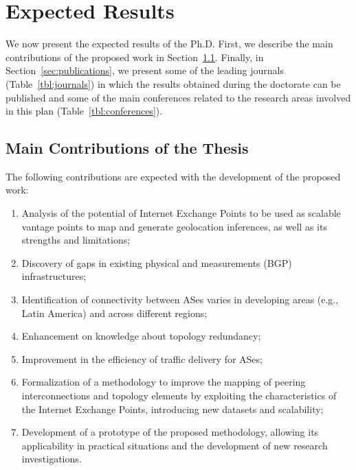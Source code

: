 \chapter{Expected Results}\label{cap:expected-results}
\thispagestyle{empty}

	We now present the expected results of the Ph.D. First, we describe the main contributions of the proposed work in Section~\ref{sec:contributions}. Finally, in Section~\ref{sec:publications}, we present some of the leading journals (Table~\ref{tbl:journals}) in which the results obtained during the doctorate can be published and some of the main conferences related to the research areas involved in this plan (Table~\ref{tbl:conferences}).

	\section{Main Contributions of the Thesis}\label{sec:contributions}
	\thispagestyle{empty}

	The following contributions are expected with the development of the proposed work:

	\begin{enumerate}
    \item Analysis of the potential of Internet Exchange Points to be used as scalable vantage points to map and generate geolocation inferences, as well as its strengths and limitations;

    \item Discovery of gaps in existing physical and measurements (BGP) infrastructures;

    \item Identification of connectivity between ASes varies in developing areas (e.g., Latin America) and across different regions;

    \item Enhancement on knowledge about topology redundancy;

    \item Improvement in the efficiency of traffic delivery for ASes;

    \item Formalization of a methodology to improve the mapping of peering interconnections and topology elements by exploiting the characteristics of the Internet Exchange Points, introducing new datasets and scalability;

    \item Development of a prototype of the proposed methodology, allowing its applicability in practical situations and the development of new research investigations.
    \end{enumerate}

